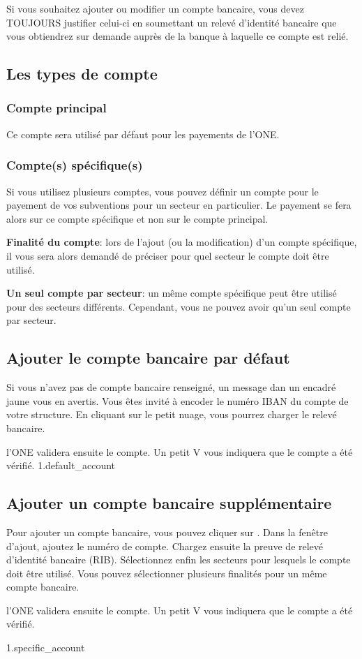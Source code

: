 \begin{attention}
Si vous souhaitez ajouter ou modifier un compte bancaire, vous devez TOUJOURS justifier celui-ci en soumettant un \textcolor{rouge}{relevé d’identité bancaire} que vous obtiendrez sur demande auprès de la banque à laquelle ce compte est relié.
\end{attention}

\subsection{Les types de compte}
\subsubsection{Compte principal}
Ce compte sera utilisé par défaut pour les payements de l'ONE.

\subsubsection{Compte(s) spécifique(s)}
Si vous utilisez plusieurs comptes, vous pouvez définir un compte pour le payement de vos subventions pour un secteur en particulier. Le payement se fera alors sur ce compte spécifique et non sur le compte principal.

\textbf{Finalité du compte}: lors de l'ajout (ou la modification) d'un compte spécifique, il vous sera alors demandé de préciser pour quel secteur le compte doit être utilisé. 

\textbf{Un seul compte par secteur}: un même compte spécifique peut être utilisé pour des secteurs différents. Cependant, vous ne pouvez avoir qu'un seul compte par secteur.

\subsection{Ajouter le compte bancaire par défaut}
Si vous n'avez pas de compte bancaire renseigné, un message dan un encadré jaune vous en avertis. Vous êtes invité à encoder le numéro IBAN du compte de votre structure. En cliquant sur le petit nuage, vous pourrez charger le relevé bancaire.

l'ONE validera ensuite le compte. Un petit V vous indiquera que le compte a été vérifié.
{1.default_account}


\subsection{Ajouter un compte bancaire supplémentaire}
Pour ajouter un compte bancaire, vous pouvez cliquer sur . Dans la fenêtre d'ajout, ajoutez le numéro de compte.  Chargez ensuite la preuve de relevé d'identité bancaire (RIB). Sélectionnez enfin les secteurs pour lesquels le compte doit être utilisé. Vous pouvez sélectionner plusieurs finalités pour un même compte bancaire.

l'ONE validera ensuite le compte. Un petit V vous indiquera que le compte a été vérifié.



{1.specific_account}

